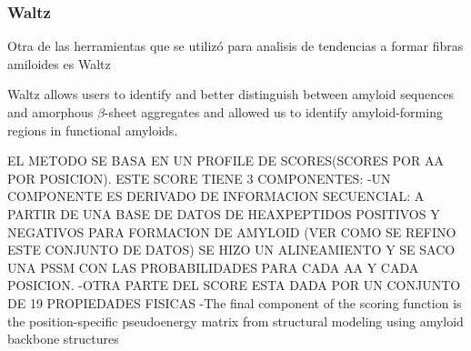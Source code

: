 \subsubsection{Waltz}


Otra de las herramientas que se utilizó para analisis de tendencias a formar fibras amiloides es Waltz \cite{maurer2010exploring}

Waltz allows users to identify and better distinguish between amyloid sequences and amorphous $\beta$-sheet aggregates and allowed us to identify
amyloid-forming regions in functional amyloids.

EL METODO SE BASA EN UN PROFILE DE SCORES(SCORES POR AA POR POSICION). ESTE SCORE TIENE 3 COMPONENTES:
-UN COMPONENTE ES DERIVADO DE INFORMACION SECUENCIAL: A PARTIR DE UNA BASE DE DATOS DE HEAXPEPTIDOS POSITIVOS Y NEGATIVOS PARA FORMACION DE AMYLOID (VER COMO SE REFINO ESTE CONJUNTO DE DATOS) 
SE HIZO UN ALINEAMIENTO Y SE SACO UNA PSSM CON LAS PROBABILIDADES PARA CADA AA Y CADA POSICION.
-OTRA PARTE DEL SCORE ESTA DADA POR UN CONJUNTO DE 19 PROPIEDADES FISICAS 
-The final component of the scoring function is the position-specific pseudoenergy matrix from structural modeling using amyloid backbone structures

